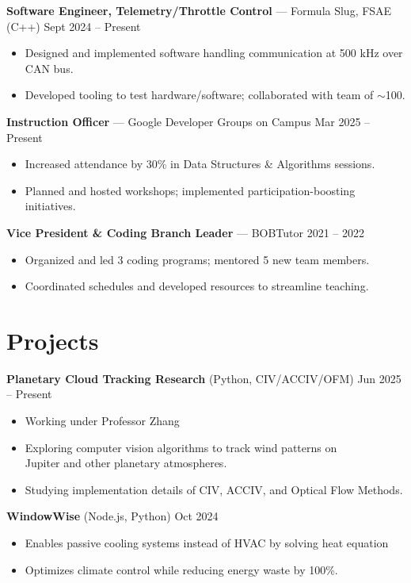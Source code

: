 \documentclass[a4paper,10pt]{article}
\begin{document}
\textbf{Software Engineer, Telemetry/Throttle Control} --- Formula Slug, FSAE (C++)
\hfill Sept 2024 -- Present
\begin{itemize}
    \item Designed and implemented software handling communication at 500 kHz over CAN bus.
    \item Developed tooling to test hardware/software; collaborated with team of $\sim$100.
\end{itemize}

\textbf{Instruction Officer} --- Google Developer Groups on Campus \hfill Mar
2025 -- Present
\begin{itemize}
    \item Increased attendance by 30\% in Data Structures \& Algorithms sessions.
    \item Planned and hosted workshops; implemented participation-boosting initiatives.
\end{itemize}

\textbf{Vice President \& Coding Branch Leader} --- BOBTutor \hfill 2021 --
2022
\begin{itemize}
    \item Organized and led 3 coding programs; mentored 5 new team members.
    \item Coordinated schedules and developed resources to streamline teaching.
\end{itemize}

\section*{Projects}
\textbf{Planetary Cloud Tracking Research} (Python, CIV/ACCIV/OFM) \hfill Jun 2025 -- Present
\begin{itemize}
    \item Working under Professor Zhang
    \item Exploring computer vision algorithms to track wind patterns on \\
        Jupiter and other planetary atmospheres.
    \item Studying implementation details of CIV, ACCIV, and Optical Flow
        Methods.
\end{itemize}

\textbf{WindowWise} (Node.js, Python) \hfill Oct 2024
\begin{itemize}
    \item Enables passive cooling systems instead of HVAC by solving heat equation
    \item Optimizes climate control while reducing energy waste by 100\%.
\end{itemize}
\end{document}
